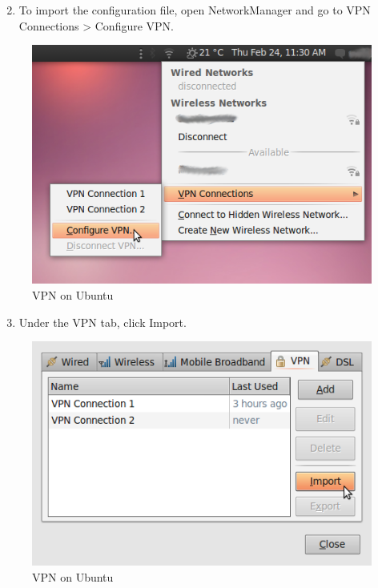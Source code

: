 \begin{enumerate}[1.]
\setcounter{enumi}{1}
\item
  To import the configuration file, open NetworkManager and go to VPN
  Connections \textgreater{} Configure VPN.
\end{enumerate}
\begin{figure}[htbp]
\centering
\includegraphics{vpn_ubuntu_009.png}
\caption{VPN on Ubuntu}
\end{figure}

\begin{enumerate}[1.]
\setcounter{enumi}{2}
\item
  Under the VPN tab, click Import.
\end{enumerate}
\begin{figure}[htbp]
\centering
\includegraphics{vpn_ubuntu_010.png}
\caption{VPN on Ubuntu}
\end{figure}

